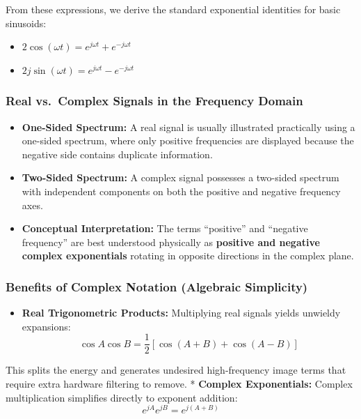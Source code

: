 \documentclass[
]{article}
\providecommand{\tightlist}{%
  \setlength{\itemsep}{0pt}\setlength{\parskip}{0pt}}
\begin{document}
From these expressions, we derive the standard exponential identities
for basic sinusoids:

\begin{itemize}
\tightlist
\item
  \(2\cos(\omega t) = e^{j\omega t} + e^{-j\omega t}\)
\item
  \(2j\sin(\omega t) = e^{j\omega t} - e^{-j\omega t}\)
\end{itemize}

\subsubsection{Real vs.~Complex Signals in the Frequency
Domain}\label{real-vs.-complex-signals-in-the-frequency-domain}

\begin{itemize}
\tightlist
\item
  \textbf{One-Sided Spectrum:} A real signal is usually illustrated
  practically using a one-sided spectrum, where only positive
  frequencies are displayed because the negative side contains duplicate
  information.
\item
  \textbf{Two-Sided Spectrum:} A complex signal possesses a two-sided
  spectrum with independent components on both the positive and negative
  frequency axes.
\item
  \textbf{Conceptual Interpretation:} The terms ``positive'' and
  ``negative frequency'' are best understood physically as
  \textbf{positive and negative complex exponentials} rotating in
  opposite directions in the complex plane.
\end{itemize}

\subsubsection{Benefits of Complex Notation (Algebraic
Simplicity)}\label{benefits-of-complex-notation-algebraic-simplicity}

\begin{itemize}
\tightlist
\item
  \textbf{Real Trigonometric Products:} Multiplying real signals yields
  unwieldy expansions:
  $$\cos A \cos B = \frac{1}{2}\left[\cos(A+B)+\cos(A-B)\right]$$
\end{itemize}

This splits the energy and generates undesired high-frequency image
terms that require extra hardware filtering to remove. * \textbf{Complex
Exponentials:} Complex multiplication simplifies directly to exponent
addition: \[e^{jA} e^{jB} = e^{j(A+B)}\]
\end{document}
